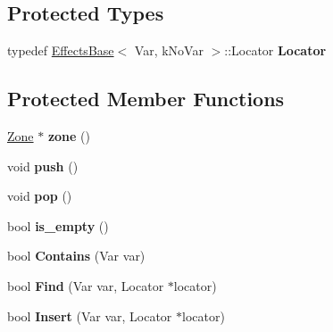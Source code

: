 \subsection*{Protected Types}
\begin{DoxyCompactItemize}
\item 
typedef \hyperlink{classv8_1_1internal_1_1_effects_base}{Effects\+Base}$<$ Var, k\+No\+Var $>$\+::Locator {\bfseries Locator}\hypertarget{classv8_1_1internal_1_1_nested_effects_base_a915cce4fbd939205a4486efc34b5d692}{}\label{classv8_1_1internal_1_1_nested_effects_base_a915cce4fbd939205a4486efc34b5d692}

\end{DoxyCompactItemize}
\subsection*{Protected Member Functions}
\begin{DoxyCompactItemize}
\item 
\hyperlink{classv8_1_1internal_1_1_zone}{Zone} $\ast$ {\bfseries zone} ()\hypertarget{classv8_1_1internal_1_1_nested_effects_base_a1829ea64f6cf50ec12bcf6c47fcb3342}{}\label{classv8_1_1internal_1_1_nested_effects_base_a1829ea64f6cf50ec12bcf6c47fcb3342}

\item 
void {\bfseries push} ()\hypertarget{classv8_1_1internal_1_1_nested_effects_base_a42b0d67232ed75d03feca4898a78be14}{}\label{classv8_1_1internal_1_1_nested_effects_base_a42b0d67232ed75d03feca4898a78be14}

\item 
void {\bfseries pop} ()\hypertarget{classv8_1_1internal_1_1_nested_effects_base_a8314d6c3c731945245facd496e9929ee}{}\label{classv8_1_1internal_1_1_nested_effects_base_a8314d6c3c731945245facd496e9929ee}

\item 
bool {\bfseries is\+\_\+empty} ()\hypertarget{classv8_1_1internal_1_1_nested_effects_base_a6e92c6847751fcabf62a9a40c493ba67}{}\label{classv8_1_1internal_1_1_nested_effects_base_a6e92c6847751fcabf62a9a40c493ba67}

\item 
bool {\bfseries Contains} (Var var)\hypertarget{classv8_1_1internal_1_1_nested_effects_base_a08b80cebfece99559b3bc6c1f7faab94}{}\label{classv8_1_1internal_1_1_nested_effects_base_a08b80cebfece99559b3bc6c1f7faab94}

\item 
bool {\bfseries Find} (Var var, Locator $\ast$locator)\hypertarget{classv8_1_1internal_1_1_nested_effects_base_a65ad078fb3e5355a67bf51ba362469f2}{}\label{classv8_1_1internal_1_1_nested_effects_base_a65ad078fb3e5355a67bf51ba362469f2}

\item 
bool {\bfseries Insert} (Var var, Locator $\ast$locator)\hypertarget{classv8_1_1internal_1_1_nested_effects_base_a73455f55cf3bbcf30867a19f6811ab92}{}\label{classv8_1_1internal_1_1_nested_effects_base_a73455f55cf3bbcf30867a19f6811ab92}

\end{DoxyCompactItemize}
